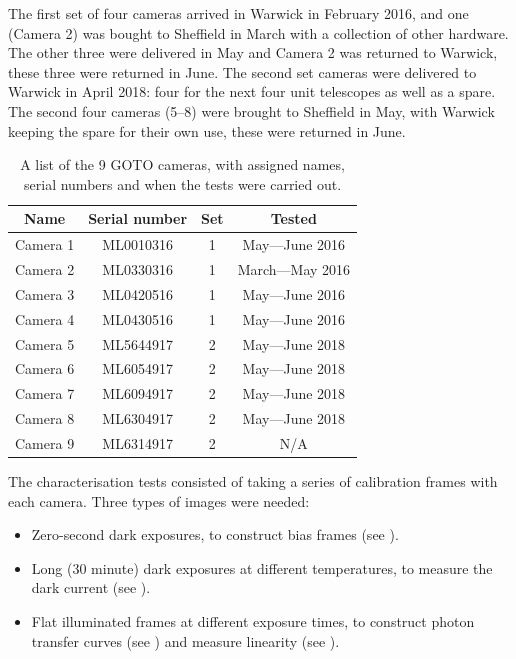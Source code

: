 \begin{colsection}
\begin{colsection}
The first set of four cameras arrived in Warwick in February 2016, and one (Camera 2) was bought to Sheffield in March with a collection of other hardware. The other three were delivered in May and Camera 2 was returned to Warwick, these three were returned in June. The second set cameras were delivered to Warwick in April 2018: four for the next four unit telescopes as well as a spare. The second four cameras (5--8) were brought to Sheffield in May, with Warwick keeping the spare for their own use, these were returned in June.

\begin{table}[t]
    \begin{center}
        \begin{tabular}{cccc} %
            Name     & Serial number & Set & Tested \\
            \midrule
            Camera 1 & ML0010316     &   1 & May---June 2016  \\
            Camera 2 & ML0330316     &   1 & March---May 2016 \\
            Camera 3 & ML0420516     &   1 & May---June 2016  \\
            Camera 4 & ML0430516     &   1 & May---June 2016  \\
            Camera 5 & ML5644917     &   2 & May---June 2018  \\
            Camera 6 & ML6054917     &   2 & May---June 2018  \\
            Camera 7 & ML6094917     &   2 & May---June 2018  \\
            Camera 8 & ML6304917     &   2 & May---June 2018  \\
            Camera 9 & ML6314917     &   2 & N/A              \\
        \end{tabular}
    \end{center}
    \caption[List of GOTO cameras]{
        A list of the 9 GOTO cameras, with assigned names, serial numbers and when the tests were carried out.
    }\label{tab:cameras}
\end{table}

The characterisation tests consisted of taking a series of calibration frames with each camera. Three types of images were needed:

\begin{itemize}
    \item Zero-second dark exposures, to construct bias frames (see ).
    \item Long (30 minute) dark exposures at different temperatures, to measure the dark current (see ).
    \item Flat illuminated frames at different exposure times, to construct photon transfer curves (see ) and measure linearity (see ).
\end{itemize}


\end{colsection}
\end{colsection}
